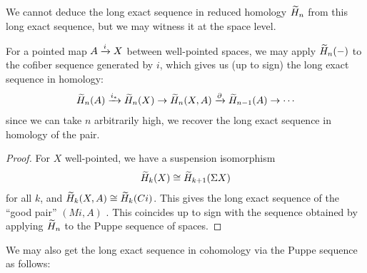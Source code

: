 \documentclass{article}[11pt]
\begin{document}
	 We cannot deduce the long exact sequence in reduced homology $\widetilde{H}_n$ from this long exact sequence, but we may witness it at the space level.

	\begin{proposition} For a pointed map $A \xrightarrow{i} X$ between well-pointed spaces, we may apply $\widetilde{H}_n(-)$ to the cofiber sequence generated by $i$, which gives us (up to sign) the long exact sequence in homology:
	\begin{align*}
		\widetilde{H}_n(A) \xrightarrow{i_\ast} \widetilde{H}_n(X) \to \widetilde{H}_n(X,A) \xrightarrow{\partial} \widetilde{H}_{n-1}(A) \to \cdots
	\end{align*}
	since we can take $n$ arbitrarily high, we recover the long exact sequence in homology of the pair.
	\end{proposition}
	\begin{proof} For $X$ well-pointed, we have a suspension isomorphism
	\begin{align*}
		\widetilde{H}_k(X) \cong \widetilde{H}_{k+1} (\Sigma X)
	\end{align*}
    for all $k$, and $\widetilde{H}_k(X,A) \cong \widetilde{H}_k (Ci)$. This gives the long exact sequence of the ``good pair'' $(Mi,A)$ \cite[Theorem~2.13]{hatcher}. This coincides up to sign with the sequence obtained by applying $\widetilde{H}_n$ to the Puppe sequence of spaces.
	\end{proof}

	 We may also get the long exact sequence in cohomology via the Puppe sequence as follows:
\end{document}
